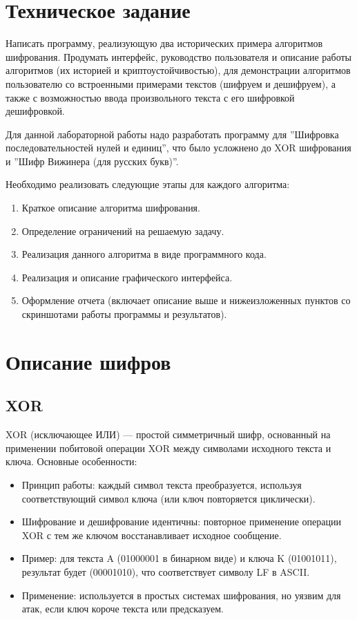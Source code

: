 \documentclass[a4paper, 12pt]{article}
\begin{document}
\newpage
\begin{center}
    \tableofcontents
\end{center}





\newpage

\section{Техническое задание}

Написать программу, реализующую два исторических примера алгоритмов шифрования. Продумать интерфейс, руководство пользователя и описание работы алгоритмов (их историей и криптоустойчивостью), для демонстрации алгоритмов пользователю со встроенными примерами текстов (шифруем и дешифруем), а также с возможностью ввода произвольного текста с его шифровкой дешифровкой.

Для данной лабораторной работы надо разработать программу для ''Шифровка последовательностей нулей и единиц'', что было усложнено до XOR шифрования и ''Шифр Вижинера (для русских букв)''.

Необходимо реализовать следующие этапы для каждого алгоритма:
\begin{enumerate}
    \item Краткое описание алгоритма шифрования.
    \item Определение ограничений на решаемую задачу.
    \item Реализация данного алгоритма в виде программного кода.
    \item Реализация и описание графического интерфейса.
    \item Оформление отчета (включает описание выше и нижеизложенных пунктов со скриншотами работы программы и результатов).
\end{enumerate}


\section{Описание шифров}
\subsection{XOR}
XOR (исключающее ИЛИ) — простой симметричный шифр, основанный на применении побитовой операции XOR между символами исходного текста и ключа. Основные особенности:

\begin{itemize}
    \item Принцип работы: каждый символ текста преобразуется, используя соответствующий символ ключа (или ключ повторяется циклически).
    \item Шифрование и дешифрование идентичны: повторное применение операции XOR с тем же ключом восстанавливает исходное сообщение.
    \item Пример: для текста A (01000001 в бинарном виде) и ключа K (01001011), результат будет (00001010), что соответствует символу LF в ASCII.
    \item Применение: используется в простых системах шифрования, но уязвим для атак, если ключ короче текста или предсказуем.
\end{itemize}
\end{document}
